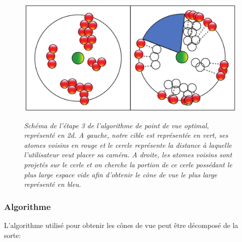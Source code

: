 \begin{figure}[h]
  \centering
  {\includegraphics[width=.5\linewidth]{./figures/ch3/voronoi_2D_algo_v2}}
    \caption[Schéma de l'étape 3 de l'algorithme de point de vue optimal, représenté en 2d.]{{\it Schéma de l'étape 3 de l'algorithme de point de vue optimal, représenté en 2d. A gauche, notre cible est représentée en vert, ses atomes voisins en rouge et le cercle représente la distance à laquelle l'utilisateur veut placer sa caméra. A droite, les atomes voisins sont projetés sur le cerle et on cherche la portion de ce cerle possédant le plus large espace vide afin d'obtenir le cône de vue le plus large représenté en bleu.}}
  \label{Fig:voronoi_2D_algo}
  \hspace{0.2cm}
\end{figure}

\subsubsection{Algorithme}

L'algorithme utilisé pour obtenir les cônes de vue peut être décomposé de la sorte:


